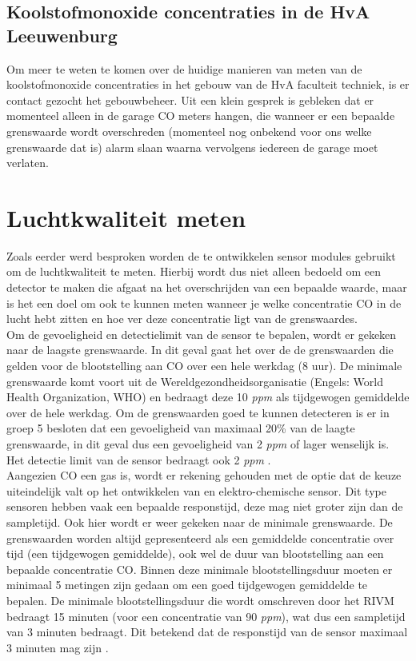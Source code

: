 \documentclass[a4paper, 11pt]{article} %
\begin{document}
	\subsection{Koolstofmonoxide concentraties in de HvA Leeuwenburg} \label{subsec::CO_HvA}
	Om meer te weten te komen over de huidige manieren van meten van de koolstofmonoxide concentraties in het gebouw van de HvA faculteit techniek, is er contact gezocht het gebouwbeheer. Uit een klein gesprek is gebleken dat er momenteel alleen in de garage CO meters hangen, die wanneer er een bepaalde grenswaarde wordt overschreden (momenteel nog onbekend voor ons welke grenswaarde dat is) alarm slaan waarna vervolgens iedereen de garage moet verlaten.
	
	\section{Luchtkwaliteit meten} \label{subsec::lucht _kwaliteit_meten}
	Zoals eerder werd besproken worden de te ontwikkelen sensor modules gebruikt om de luchtkwaliteit te meten. Hierbij wordt dus niet alleen bedoeld om een detector te maken die afgaat na het overschrijden van een bepaalde waarde, maar is het een doel om ook te kunnen meten wanneer je welke concentratie CO in de lucht hebt zitten en hoe ver deze concentratie ligt van de grenswaardes.\\
	Om de gevoeligheid en detectielimit van de sensor te bepalen, wordt er gekeken naar de laagste grenswaarde. In dit geval gaat het over de de grenswaarden die gelden voor de blootstelling aan CO over een hele werkdag (8 uur). De minimale grenswaarde komt voort uit de Wereldgezondheidsorganisatie (Engels: World Health Organization, WHO) en bedraagt deze 10 \textit{ppm} als tijdgewogen gemiddelde over de hele werkdag. Om de grenswaarden goed te kunnen detecteren is er in groep 5 besloten dat een gevoeligheid van maximaal 20\% van de laagte grenswaarde, in dit geval dus een gevoeligheid van 2 \textit{ppm} of lager wenselijk is. Het detectie limit van de sensor bedraagt ook 2 \textit{ppm} \cite{Blootstelling aan CO}.\\
	Aangezien CO een gas is, wordt er rekening gehouden met de optie dat de keuze uiteindelijk valt op het ontwikkelen van en elektro-chemische sensor. Dit type sensoren hebben vaak een bepaalde responstijd, deze mag niet groter zijn dan de sampletijd. Ook hier wordt er weer gekeken naar de minimale grenswaarde. De grenswaarden worden altijd gepresenteerd als een gemiddelde concentratie over tijd (een tijdgewogen gemiddelde), ook wel de duur van blootstelling aan een bepaalde concentratie CO. Binnen deze minimale blootstellingsduur moeten er minimaal 5 metingen zijn gedaan om een goed tijdgewogen gemiddelde te bepalen. De minimale blootstellingsduur die wordt omschreven door het RIVM bedraagt 15 minuten (voor een concentratie van 90 \textit{ppm}), wat dus een sampletijd van 3 minuten bedraagt. Dit betekend dat de responstijd van de sensor maximaal 3 minuten mag zijn \cite{Blootstelling aan CO}. \\
\end{document}
